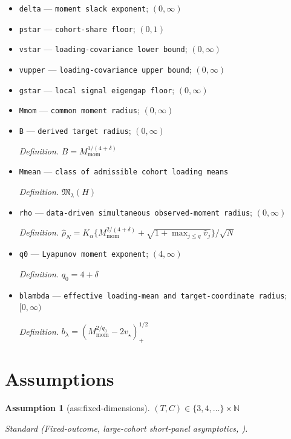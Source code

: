 \documentclass{article}
\newtheorem{assumption}{Assumption}
\begin{document}
\begin{itemize}
  \par\smallskip\noindent\emph{Definition.} \((P_\eta)_{|\eta|<\eta_0}\)
  \item \texttt{delta} --- \texttt{moment slack exponent}; \((0,\infty)\)
  \item \texttt{pstar} --- \texttt{cohort-\allowbreak{}share floor}; \((0,1)\)
  \item \texttt{vstar} --- \texttt{loading-\allowbreak{}covariance lower bound}; \((0,\infty)\)
  \item \texttt{vupper} --- \texttt{loading-\allowbreak{}covariance upper bound}; \((0,\infty)\)
  \item \texttt{gstar} --- \texttt{local signal eigengap floor}; \((0,\infty)\)
  \item \texttt{Mmom} --- \texttt{common moment radius}; \((0,\infty)\)
  \item \texttt{B} --- \texttt{derived target radius}; \((0,\infty)\)
  \par\smallskip\noindent\emph{Definition.} \(B=M_{\mathrm{mom}}^{1/(4+\delta)}\)
  \item \texttt{Mmean} --- \texttt{class of admissible cohort loading means}
  \par\smallskip\noindent\emph{Definition.} \(\mathfrak M_{\lambda}(H)\)
  \item \texttt{rho} --- \texttt{data-\allowbreak{}driven simultaneous observed-\allowbreak{}moment radius}; \((0,\infty)\)
  \par\smallskip\noindent\emph{Definition.} \(\widehat\rho_N=K_\alpha\{M_{\mathrm{mom}}^{2/(4+\delta)}+\sqrt{1+\max_{j\le q}\widehat v_j}\}/\sqrt N\)
  \item \texttt{q0} --- \texttt{Lyapunov moment exponent}; \((4,\infty)\)
  \par\smallskip\noindent\emph{Definition.} \(q_0=4+\delta\)
  \item \texttt{blambda} --- \texttt{effective loading-\allowbreak{}mean and target-\allowbreak{}coordinate radius}; \([0,\infty)\)
  \par\smallskip\noindent\emph{Definition.} \(b_\lambda=(M_{\mathrm{mom}}^{2/q_0}-2v_\star)_+^{1/2}\)
\end{itemize}

\section{Assumptions}

\begin{assumption}[ass:fixed-dimensions]\label{ass:fixed-dimensions}
\((T,C)\in\{3,4,\ldots\}\times\mathbb N\)
\par\smallskip\noindent\emph{Standard} (Fixed-outcome, large-cohort short-panel asymptotics, \cite{LeiRoss2023}).
\end{assumption}
\end{document}
